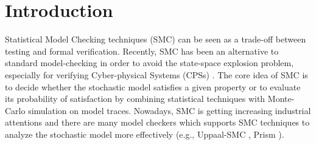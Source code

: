 \section{Introduction}
Statistical Model Checking techniques (SMC) \cite{Younes2004Planning,Sen2004Statistical,herault2004} can be seen as a trade-off between testing and formal verification. Recently, SMC has been an alternative to standard model-checking in order to avoid the state-space explosion problem, especially for verifying Cyber-physical Systems (CPSs) \cite{Yoo2016Challenges}. The core idea of SMC is to decide whether the stochastic model satisfies a given property or to evaluate its probability of satisfaction by combining statistical techniques with Monte-Carlo simulation on model traces. Nowadays, SMC is getting increasing industrial attentions and there are many model checkers which supports SMC techniques to analyze the stochastic model more effectively (e.g., Uppaal-SMC \cite{Bulychev2012UPPAAL}, Prism \cite{Kwiatkowska2002PRISM}).

